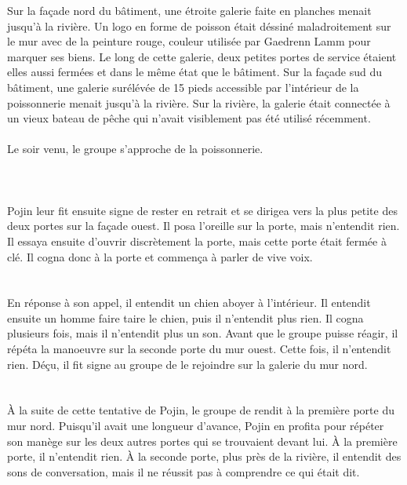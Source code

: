 \documentclass[main.tex]{subfiles}
\begin{document}
    Sur la façade nord du bâtiment, une étroite galerie faite en planches menait jusqu'à la rivière.
    Un logo en forme de poisson était déssiné maladroitement sur le mur avec de la peinture rouge, couleur utilisée par Gaedrenn Lamm pour marquer ses biens.
    Le long de cette galerie, deux petites portes de service étaient elles aussi fermées et dans le même état que le bâtiment.
    Sur la façade sud du bâtiment, une galerie surélévée de 15 pieds accessible par l'intérieur de la poissonnerie menait jusqu'à la rivière.
    Sur la rivière, la galerie était connectée à un vieux bateau de pêche qui n'avait visiblement pas été utilisé récemment.\\
    \\
    Le soir venu, le groupe s'approche de la poissonnerie.\\
    \\
    \\
    \\
    Pojin leur fit ensuite signe de rester en retrait et se dirigea vers la plus petite des deux portes sur la façade ouest.
    Il posa l'oreille sur la porte, mais n'entendit rien.
    Il essaya ensuite d'ouvrir discrètement la porte, mais cette porte était fermée à clé.
    Il cogna donc à la porte et commença à parler de vive voix.\\
    \\
    \\
    En réponse à son appel, il entendit un chien aboyer à l'intérieur.
    Il entendit ensuite un homme faire taire le chien, puis il n'entendit plus rien.
    Il cogna plusieurs fois, mais il n'entendit plus un son.
    Avant que le groupe puisse réagir, il répéta la manoeuvre sur la seconde porte du mur ouest.
    Cette fois, il n'entendit rien.
    Déçu, il fit signe au groupe de le rejoindre sur la galerie du mur nord.\\
    \\
    \\
    À la suite de cette tentative de Pojin, le groupe de rendit à la première porte du mur nord.
    Puisqu'il avait une longueur d'avance, Pojin en profita pour répéter son manège sur les deux autres portes qui se trouvaient devant lui.
    À la première porte, il n'entendit rien.
    À la seconde porte, plus près de la rivière, il entendit des sons de conversation, mais il ne réussit pas à comprendre ce qui était dit.
\end{document}
